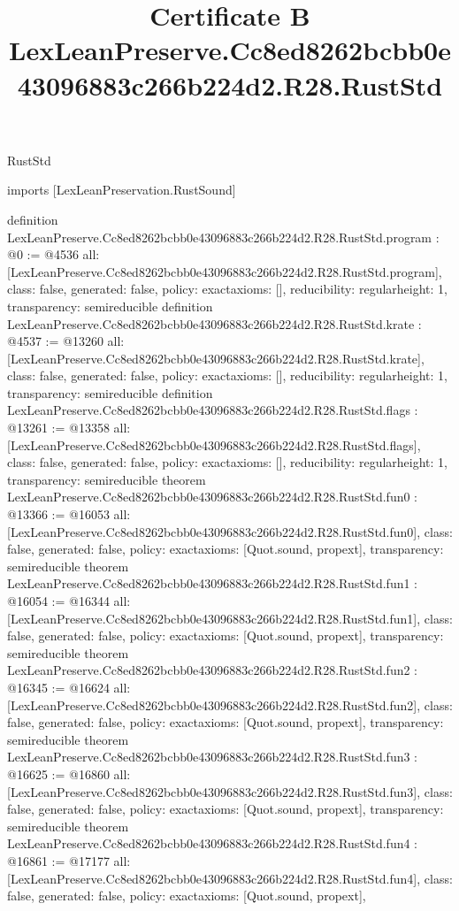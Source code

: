 \begin{lexlean}{RustStd}
\title{Certificate B LexLeanPreserve.Cc8ed8262bcbb0e43096883c266b224d2.R28.RustStd}
\begin{coremodule}
imports [LexLeanPreservation.RustSound]

definition LexLeanPreserve.Cc8ed8262bcbb0e43096883c266b224d2.R28.RustStd.program : @0 := @4536 {
  all: [LexLeanPreserve.Cc8ed8262bcbb0e43096883c266b224d2.R28.RustStd.program],
  class: false,
  generated: false,
  policy: exact{axioms: []},
  reducibility: regular{height: 1},
  transparency: semireducible
}
definition LexLeanPreserve.Cc8ed8262bcbb0e43096883c266b224d2.R28.RustStd.krate : @4537 := @13260 {
  all: [LexLeanPreserve.Cc8ed8262bcbb0e43096883c266b224d2.R28.RustStd.krate],
  class: false,
  generated: false,
  policy: exact{axioms: []},
  reducibility: regular{height: 1},
  transparency: semireducible
}
definition LexLeanPreserve.Cc8ed8262bcbb0e43096883c266b224d2.R28.RustStd.flags : @13261 := @13358 {
  all: [LexLeanPreserve.Cc8ed8262bcbb0e43096883c266b224d2.R28.RustStd.flags],
  class: false,
  generated: false,
  policy: exact{axioms: []},
  reducibility: regular{height: 1},
  transparency: semireducible
}
theorem LexLeanPreserve.Cc8ed8262bcbb0e43096883c266b224d2.R28.RustStd.fun0 : @13366 := @16053 {
  all: [LexLeanPreserve.Cc8ed8262bcbb0e43096883c266b224d2.R28.RustStd.fun0],
  class: false,
  generated: false,
  policy: exact{axioms: [Quot.sound, propext]},
  transparency: semireducible
}
theorem LexLeanPreserve.Cc8ed8262bcbb0e43096883c266b224d2.R28.RustStd.fun1 : @16054 := @16344 {
  all: [LexLeanPreserve.Cc8ed8262bcbb0e43096883c266b224d2.R28.RustStd.fun1],
  class: false,
  generated: false,
  policy: exact{axioms: [Quot.sound, propext]},
  transparency: semireducible
}
theorem LexLeanPreserve.Cc8ed8262bcbb0e43096883c266b224d2.R28.RustStd.fun2 : @16345 := @16624 {
  all: [LexLeanPreserve.Cc8ed8262bcbb0e43096883c266b224d2.R28.RustStd.fun2],
  class: false,
  generated: false,
  policy: exact{axioms: [Quot.sound, propext]},
  transparency: semireducible
}
theorem LexLeanPreserve.Cc8ed8262bcbb0e43096883c266b224d2.R28.RustStd.fun3 : @16625 := @16860 {
  all: [LexLeanPreserve.Cc8ed8262bcbb0e43096883c266b224d2.R28.RustStd.fun3],
  class: false,
  generated: false,
  policy: exact{axioms: [Quot.sound, propext]},
  transparency: semireducible
}
theorem LexLeanPreserve.Cc8ed8262bcbb0e43096883c266b224d2.R28.RustStd.fun4 : @16861 := @17177 {
  all: [LexLeanPreserve.Cc8ed8262bcbb0e43096883c266b224d2.R28.RustStd.fun4],
  class: false,
  generated: false,
  policy: exact{axioms: [Quot.sound, propext]},
}
\end{coremodule}
\end{lexlean}
